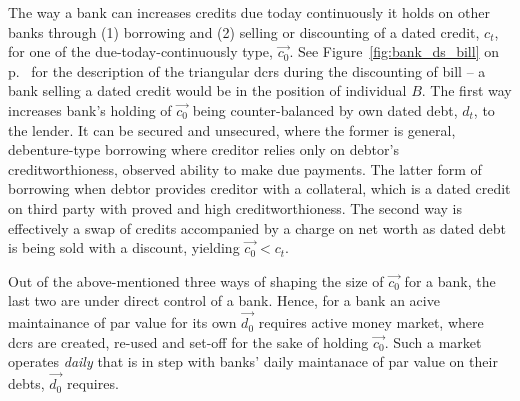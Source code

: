 The way a bank can increases credits due today continuously it holds on other banks through (1) borrowing and (2) selling or discounting of a dated credit, $c_t$, for one of the due-today-continuously type, $\overrightarrow{c_0}$. See Figure~\ref{fig:bank_ds_bill} on p.~\pageref{fig:bank_ds_bill} for the description of the triangular \acfp{dcr} during the discounting of bill -- a bank selling a dated credit would be in the position of individual $B$. The first way increases bank's holding of $\overrightarrow{c_0}$ being counter-balanced by own dated debt, $d_t$, to the lender. It can be secured and unsecured, where the former is general, debenture-type borrowing where creditor relies only on debtor's creditworthioness, observed ability to make due payments. The latter form of borrowing when debtor provides creditor with a collateral, which is a dated credit on third party with proved and high creditworthioness. The second way is effectively a swap of credits accompanied by a charge on net worth as dated debt is being sold with a discount, yielding $\overrightarrow{c_0}<c_t$.

Out of the above-mentioned three ways of shaping the size of $\overrightarrow{c_0}$ for a bank, the last two are under direct control of a bank. Hence, for a bank an acive maintainance of par value for its own $\overrightarrow{d_0}$ requires active money market, where \acfp{dcr} are created, re-used and set-off for the sake of holding $\overrightarrow{c_0}$. Such a market operates \textit{daily} that is in step with banks' daily maintanace of par value on their debts, $\overrightarrow{d_0}$ requires.


